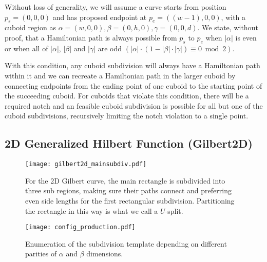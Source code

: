 Without loss of generality, we will assume a curve starts from position $p_s=(0,0,0)$ and has proposed
endpoint at $p_e=((w-1),0,0)$, with a cuboid region as $\alpha = (w,0,0), \beta = (0,h,0), \gamma = (0,0,d)$.
We state, without proof, that
a Hamiltonian path is always possible from $p_s$ to $p_e$ when $|\alpha|$ is even or when all of $|\alpha|$, $|\beta|$ and $|\gamma|$
are odd  $(|\alpha| \cdot (1 - |\beta| \cdot |\gamma|) \equiv 0 \bmod 2)$.

With this condition, any cuboid subdivision will always have a Hamiltonian path within it and we can recreate a Hamiltonian
path in the larger cuboid by connecting endpoints from the ending point of one cuboid to the starting point of the succeeding cuboid.
For cuboids that violate this condition, there will be a required notch and
an feasible cuboid subdivision is possible
for all but one of the cuboid subdivisions, recursively limiting the notch violation to a single point.




\subsection{2D Generalized Hilbert Function (Gilbert2D)}

\begin{figure}[h]
  \centering
  \texttt{[image: gilbert2d\_mainsubdiv.pdf]}
  \caption{ For the 2D Gilbert curve, the main rectangle is subdivided into three sub regions, making sure their paths connect
            and preferring even side lengths for the first rectangular subdivision.
            Partitioning the rectangle in this way is what we call a $U$-split.  }
  \label{fig:main2dsubdiv}
\end{figure}


\begin{figure*}[ht]
  \centering
  \texttt{[image: config\_production.pdf]}
  \caption{ Enumeration of the subdivision template depending on different parities of $\alpha$ and $\beta$ dimensions. }
  \label{fig:production2d}
\end{figure*}

